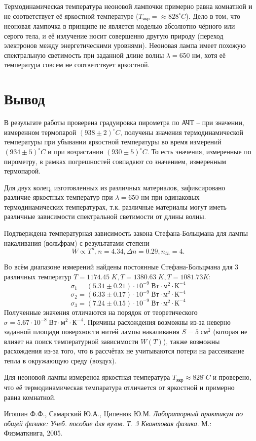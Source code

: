 \documentclass[a4paper, 12pt]{article}%
\begin{document}
    Термодинамическая температура неоновой лампочки примерно равна комнатной и не соответствует её яркостной температуре ($T_{\text{якр}} = \approx 828 ^\circ C$). Дело в том, что неоновая лампочка в принципе не является моделью абсолютно чёрного или серого тела, и её излучение носит совершенно другую природу (переход электронов между энергетическими уровнями). Неоновая лампа имеет похожую спектральную светимость при заданной длине волны $\lambda = 650$ нм, хотя её температура совсем не соответствует яркостной.


\section{Вывод}

    В результате работы проверена градуировка пирометра по АЧТ -- при значении, измеренном термопарой $(938 \pm 2) ^\circ C$, получены значения термодинамической температуры при убывании яркостной температуры во время измерений $(934 \pm 5) ^\circ C$ и при возрастании $(930 \pm 5) ^\circ C$. То есть значения, измеренные по пирометру, в рамках погрешностей совпадают со значением, измеренным термопарой.

    Для двух колец, изготовленных из различных материалов, зафиксировано различие яркостных температур при $\lambda = 650$ нм при одинаковых термодинамических температурах, т.к. различные материалы могут иметь различные зависимости спектральной светимости от длины волны.

    Подтверждена температурная зависимость закона Стефана-Больцмана для лампы накаливания (вольфрам) с результатами степени
    \begin{equation*}
        W \propto T^n, n = 4.34, \Delta n = 0.29, n_{th} = 4.
    \end{equation*}

    Во всём диапазоне измерений найдены постоянные Стефана-Больцмана для 3 различных температур $T = 1174.45 \; K, T = 1380.63 \; K, T = 1081.73 K$:
    $$ \sigma_1 = (5.31 \pm 0.21) \cdot 10^{-9} \; \text{Вт} \cdot \text{м}^2 \cdot \text{К}^{-4} $$
    $$ \sigma_2 = (6.33 \pm 0.17) \cdot 10^{-9} \; \text{Вт} \cdot \text{м}^2 \cdot \text{К}^{-4} $$
    $$ \sigma_3 = (7.24 \pm 0.15) \cdot 10^{-9} \; \text{Вт} \cdot \text{м}^2 \cdot \text{К}^{-4} $$
    Полученные значения отличаются на порядок от теоретического $\sigma = 5.67 \cdot 10^{-8} \; \text{Вт} \cdot \text{м}^2 \cdot \text{К}^{-4}$. Причины расхождения возможны из-за неверно заданной площади поверхности нитей лампы накаливания $S = 5 \; \text{см}^2$ (которая не влияет на поиск температурной зависимости $W(T)$), также возможны расхождения из-за того, что в рассчётах не учитываются потери на рассеивание тепла в окружающую среду (воздух).

    Для неоновой лампы измереноа яркостная температура $T_{\text{якр}} \approx 828 ^\circ C$ и проверено, что её термодинамическая темпаратура отличается от яркостной и примерно равна комнатной.


\begin{thebibliography}{9}
Игошин Ф.Ф., Самарский Ю.А., Ципенюк Ю.М. 
\textit{Лабораторный практикум по общей физике: Учеб. пособие для вузов. Т. 3 Квантовая физика}. 
М.: Физматкнига, 2005.
\end{thebibliography}
\end{document}
